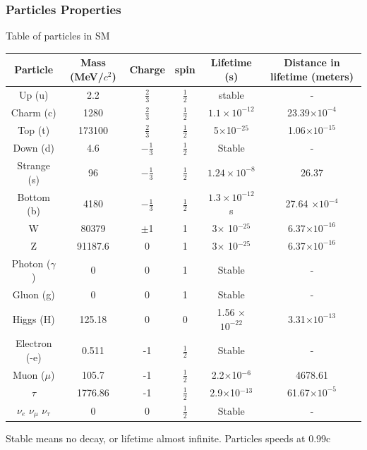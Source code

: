 \documentclass[11pt]{beamer}
\begin{document}
\begin{frame}
\frametitle{Particles Properties}
Table of particles in SM
\begin{table}
\tiny{\renewcommand{\arraystretch}{1.5}
\begin{tabular}{|c|c|c|c|c|c|}
	\hline 
Particle	&Mass (MeV/$c^2$)  &Charge  & spin &Lifetime (s)  & Distance in lifetime (meters) \\ 
	\hline 
Up (u)	& 2.2 & $\frac{2}{3}$ & $\frac{1}{2}$ & stable &  -\\ 
	\hline 
Charm (c)	& 1280 &$\frac{2}{3}$  &  $\frac{1}{2}$ & $ 1.1 \times 10^{-12}$ &  23.39$\times 10^{-4}$ \\ 
	\hline 
Top	(t)& 173100 & $\frac{2}{3}$ & $\frac{1}{2}$  & 5$\times$10$^{-25}$ &1.06$\times 10^{-15}$   \\ 
	\hline 
Down (d)	& 4.6 &$-\frac{1}{3}$  & $\frac{1}{2}$  & Stable & - \\ 
	\hline 
Strange (s)	& 96 &$-\frac{1}{3}$  & $\frac{1}{2}$  &$1.24 \times 10^{-8}$  & 26.37 \\ 
	\hline 
Bottom (b)	& 4180 &$-\frac{1}{3}$  &  $\frac{1}{2}$ &$1.3 \times 10^{-12}$ s  & 27.64 $\times 10^{-4}$\\ 
	\hline 
W 	& 80379 &$\pm$1  & 1 & 3$\times$ 10$^{-25}$ &  6.37$\times 10^{-16}$\\ 
	\hline 
Z & 91187.6 &0  & 1 & 3$\times$ 10$^{-25}$  &6.37$\times 10^{-16}$ \\ 
\hline
Photon ($\gamma$) & 0 &0  &  1&Stable  & - \\ 
\hline
Gluon (g)	& 0 &0  &  1&Stable  & - \\ 
	\hline 
Higgs (H)	& 125.18 &0  &  0& 1.56 $\times$ $10^{-22}$ & 3.31$\times 10^{-13}$ \\ 
	\hline 
Electron (-e)& 0.511 & -1 &   $\frac{1}{2}$& Stable & - \\ 
	\hline 
Muon ($\mu$)	& 105.7 & -1  &  $\frac{1}{2}$ & 2.2$\times$10$^{-6}$ & 4678.61 \\ 
	\hline 
$\tau$	& 1776.86 &-1  &  $\frac{1}{2}$ & 2.9$\times$10$^{-13}$ & 61.67$\times 10^{-5}$\\ 
	\hline 
$\nu_e$	$\nu_\mu$ $\nu_\tau$& 0 & 0 &  $\frac{1}{2}$ & Stable &  -\\ 
	\hline 
\end{tabular} 
}
\end{table}
\tiny{Stable means no decay, or lifetime almost infinite. Particles speeds at 0.99c}
\end{frame}
\end{document}
